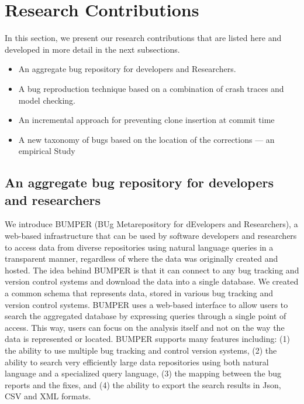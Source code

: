 \section{Research Contributions\label{sec:objective-thesis}}

In this section, we present our research contributions that are listed here and developed in more detail in the next subsections.

\begin{itemize}
	\item An aggregate bug  repository for  developers  and  Researchers.
	\item A bug reproduction technique based on a combination of crash traces and model checking.
	\item An incremental approach for preventing clone insertion at commit time
	\item A new taxonomy of bugs based on the location of the corrections --- an empirical Study
\end{itemize}

\subsection{An aggregate bug  repository for  developers  and  researchers}
We introduce BUMPER (BUg Metarepository for  dEvelopers  and  Researchers),  a  web-based  infrastructure
that  can  be  used  by  software  developers  and  researchers  to access  data  from  diverse  repositories  using  natural  language queries in a transparent manner, regardless of where the data was originally created and hosted.
The  idea  behind  BUMPER  is  that  it  can  connect  to  any bug  tracking  and  version  control  systems  and  download  the data  into  a  single  database.
We  created  a  common  schema that represents data, stored in various bug tracking and version control systems.
BUMPER uses a web-based interface to allow users to search the aggregated database by expressing queries through a single point of access.
This way, users can focus on the analysis itself and not on the way the data is represented or located.
BUMPER supports many features including: (1) the ability to use multiple bug tracking and control version systems, (2) the  ability  to  search  very  efficiently  large  data  repositories using both natural language and a specialized query language, (3)  the  mapping  between  the  bug  reports  and  the  fixes,  and (4)  the  ability  to  export  the  search  results  in  Json,  CSV  and XML formats.

